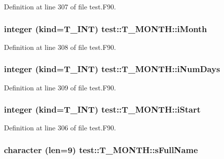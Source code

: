 Definition at line 307 of file test.F90.

\hypertarget{typetest_1_1_t___m_o_n_t_h_a407be426a9598375ea97130260d4eb27}{
\subsubsection[{iMonth}]{\setlength{\rightskip}{0pt plus 5cm}integer (kind={\bf T\_\-INT}) {\bf test::T\_\-MONTH::iMonth}}}
\label{typetest_1_1_t___m_o_n_t_h_a407be426a9598375ea97130260d4eb27}


Definition at line 308 of file test.F90.

\hypertarget{typetest_1_1_t___m_o_n_t_h_a18c9a8c3120a2f45a8a3b6d59f40221a}{
\subsubsection[{iNumDays}]{\setlength{\rightskip}{0pt plus 5cm}integer (kind={\bf T\_\-INT}) {\bf test::T\_\-MONTH::iNumDays}}}
\label{typetest_1_1_t___m_o_n_t_h_a18c9a8c3120a2f45a8a3b6d59f40221a}


Definition at line 309 of file test.F90.

\hypertarget{typetest_1_1_t___m_o_n_t_h_a8824b1666706cf6ca7c75ac95054571b}{
\subsubsection[{iStart}]{\setlength{\rightskip}{0pt plus 5cm}integer (kind={\bf T\_\-INT}) {\bf test::T\_\-MONTH::iStart}}}
\label{typetest_1_1_t___m_o_n_t_h_a8824b1666706cf6ca7c75ac95054571b}


Definition at line 306 of file test.F90.

\hypertarget{typetest_1_1_t___m_o_n_t_h_aaf3cd930d44866feb833cbaac6af9af5}{
\subsubsection[{sFullName}]{\setlength{\rightskip}{0pt plus 5cm}character (len=9) {\bf test::T\_\-MONTH::sFullName}}}
\label{typetest_1_1_t___m_o_n_t_h_aaf3cd930d44866feb833cbaac6af9af5}


